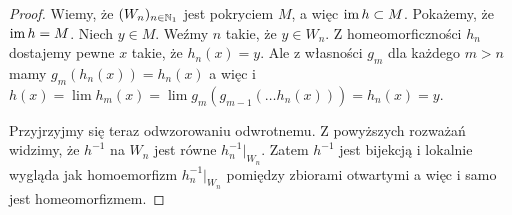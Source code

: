 \begin{thm}
\begin{proof}
    Wiemy, że $(W_n)_{n\in{\mathbb{N}_1}}$ jest pokryciem $M$, a więc $\operatorname{im} h \subset M$. Pokażemy, że $\operatorname{im} h = M$. Niech $y\in M$. Weźmy $n$ takie, że $y\in W_n$. Z homeomorficzności $h_n$ dostajemy pewne $x$ takie, że $h_n(x) = y$. Ale z własności $g_m$ dla każdego $m > n$ mamy $g_m(h_n(x)) = h_n(x)$ a więc i $h(x) = \lim h_m(x) = \lim g_m(g_{m-1}(\dots h_n(x))) = h_n(x) = y$.
    
    Przyjrzyjmy się teraz odwzorowaniu odwrotnemu. Z powyższych rozważań widzimy, że $h^{-1}$ na $W_n$ jest równe $h_n^{-1}|_{W_n}$. Zatem $h^{-1}$ jest bijekcją i lokalnie wygląda jak homoemorfizm $h_n^{-1}|_{W_n}$ pomiędzy zbiorami otwartymi a więc i samo jest homeomorfizmem.
  \end{proof}
\end{thm}

 